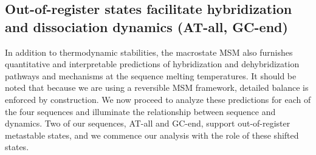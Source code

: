 \documentclass[journal=jpcbfk,manuscript=article]{achemso}
\newcommand*{\rood}[1]{{#1}}
\begin{document}
\subsection{Out-of-register states facilitate hybridization and dissociation dynamics (AT-all, GC-end)}

In addition to thermodynamic stabilities, the macrostate MSM also furnishes quantitative and interpretable predictions of hybridization and dehybridization pathways and mechanisms \rood{at the sequence melting temperatures}. \rood{It should be noted that because we are using a reversible MSM framework, detailed balance is enforced by construction.} We now proceed to analyze these predictions for each of the four sequences and illuminate the relationship between sequence and dynamics. Two of our sequences, AT-all and GC-end, support out-of-register metastable states, and we commence our analysis with the role of these shifted states.
\end{document}
